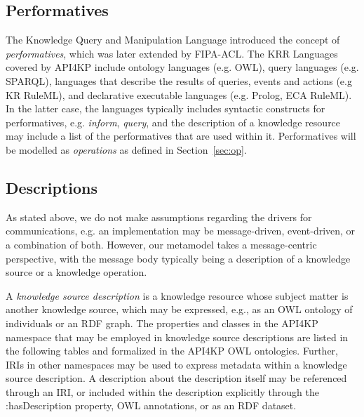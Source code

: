 \documentclass[runningheads]{llncs}
\begin{document}
\subsection{Performatives}
The Knowledge Query and Manipulation Language\cite{Finin:1994:KAC:191246.191322} introduced the concept of \emph{performatives}, which was later extended by FIPA-ACL\cite{FIPA-ACL}.
The KRR Languages covered by API4KP include ontology languages (e.g. OWL), query languages (e.g. SPARQL), languages that describe the results of queries, events and actions (e.g KR RuleML), and declarative executable languages (e.g. Prolog, ECA RuleML). In the latter case, the languages typically includes syntactic constructs for performatives, e.g. \emph{inform}, \emph{query}, and the description of a knowledge resource may include a list of the performatives that are used within it.  Performatives will be modelled as \emph{operations} as defined in Section~\ref{sec:op}.




\subsection{Descriptions}
As stated above, we do not make assumptions regarding the drivers for communications, e.g. an implementation may be message-driven, event-driven, or a combination of both. However, our metamodel takes a message-centric perspective, with the message body typically being a description of a knowledge source or a knowledge operation.

A \emph{knowledge source description} is a knowledge resource whose subject matter is another knowledge source, which may be expressed, e.g., as an OWL ontology of individuals or an RDF graph. The properties and classes in the API4KP namespace that may be employed in knowledge source descriptions are listed in the following tables and formalized in the API4KP OWL ontologies. Further, IRIs in other namespaces may be used to express metadata within a knowledge source description. A description about the description itself may be referenced through an IRI, or included within the description explicitly through the :hasDescription property,  OWL annotations, or as an RDF dataset\cite{RDF2014b}.
\end{document}
